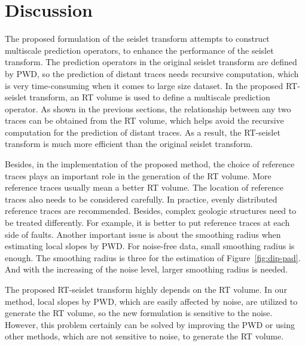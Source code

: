 \section{Discussion}
    The proposed formulation of the seislet transform attempts to construct 
    multiscale prediction operators, to enhance the performance of the 
    seislet transform. 
    The prediction operators in the original seislet transform are defined by 
    PWD, so the prediction of distant traces needs recursive computation, which 
    is very time-consuming when it comes to large size dataset. 
    In the proposed RT-seislet transform, an RT volume is used to define a 
    multiscale prediction operator. 
    As shown in the previous sections, the relationship between any two traces 
    can be obtained from the RT volume, which helps avoid the recursive 
    computation for the prediction of distant traces. 
    As a result, the RT-seislet transform is much more efficient than the 
    original seislet transform.

    Besides, in the implementation of the proposed method, the choice of 
    reference traces plays an important role in the generation of the RT volume. 
    More reference traces usually mean a better RT volume. 
    The location of reference traces also needs to be considered carefully. 
    In practice, evenly distributed reference traces are recommended.
    Besides, complex geologic structures need to be treated differently.
    For example, it is better to put reference traces at each side of faults. 
    Another important issue is about the smoothing radius when estimating local 
    slopes by PWD. 
    For noise-free data, small smoothing radius is enough. 
    The smoothing radius is three for the estimation of 
    Figure~\ref{fig:dip-pad}. 
    And with the increasing of the noise level, larger smoothing radius is 
    needed. 

    The proposed RT-seislet transform highly depends on the RT volume. 
    In our method, local slopes by PWD, which are easily affected by noise, are 
    utilized to generate the RT volume, so the new formulation is sensitive to 
    the noise. 
    However, this problem certainly can be solved by improving the PWD or using 
    other methods, which are not sensitive to noise, to generate the RT volume.

